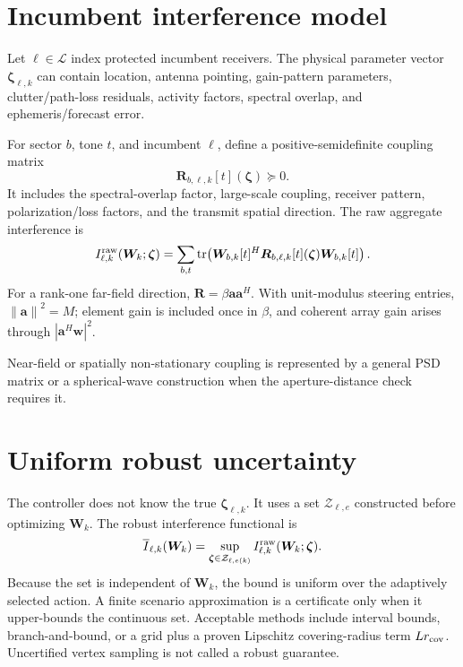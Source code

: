 \documentclass[11pt]{article}
\newcommand{\W}{\bm W}
\newcommand{\R}{\bm R}
\newcommand{\Zset}{\mathcal Z}
\newcommand{\tr}{\operatorname{tr}}
\newcommand{\norm}[1]{\left\lVert #1\right\rVert}
\begin{document}
\section{Incumbent interference model}

Let $\ell\in\mathcal L$ index protected incumbent receivers. The physical parameter vector $\bm\zeta_{\ell,k}$ can contain location, antenna pointing, gain-pattern parameters, clutter/path-loss residuals, activity factors, spectral overlap, and ephemeris/forecast error.

For sector $b$, tone $t$, and incumbent $\ell$, define a positive-semidefinite coupling matrix
\begin{equation}
 \R_{b,\ell,k}[t](\bm\zeta)\succeq0.
\end{equation}
It includes the spectral-overlap factor, large-scale coupling, receiver pattern, polarization/loss factors, and the transmit spatial direction. The raw aggregate interference is
\begin{equation}
 I^{\rm raw}_{\ell,k}(\W_k;\bm\zeta)
 =\sum_{b,t}\tr\!\left(\W_{b,k}[t]^H\R_{b,\ell,k}[t](\bm\zeta)\W_{b,k}[t]\right).
 \label{eq:rawI}
\end{equation}
For a rank-one far-field direction, $\R=\beta\bm a\bm a^H$. With unit-modulus steering entries, $\norm{\bm a}^2=M$; element gain is included once in $\beta$, and coherent array gain arises through $|\bm a^H\bm w|^2$.

Near-field or spatially non-stationary coupling is represented by a general PSD matrix or a spherical-wave construction when the aperture-distance check requires it.

\section{Uniform robust uncertainty}

The controller does not know the true $\bm\zeta_{\ell,k}$. It uses a set $\Zset_{\ell,e}$ constructed before optimizing $\W_k$. The robust interference functional is
\begin{equation}
 \overline I_{\ell,k}(\W_k)
 =\sup_{\bm\zeta\in\Zset_{\ell,e(k)}}
 I^{\rm raw}_{\ell,k}(\W_k;\bm\zeta).
 \label{eq:robustI}
\end{equation}
Because the set is independent of $\W_k$, the bound is uniform over the adaptively selected action. A finite scenario approximation is a certificate only when it upper-bounds the continuous set. Acceptable methods include interval bounds, branch-and-bound, or a grid plus a proven Lipschitz covering-radius term $Lr_{\rm cov}$. Uncertified vertex sampling is not called a robust guarantee.
\end{document}
